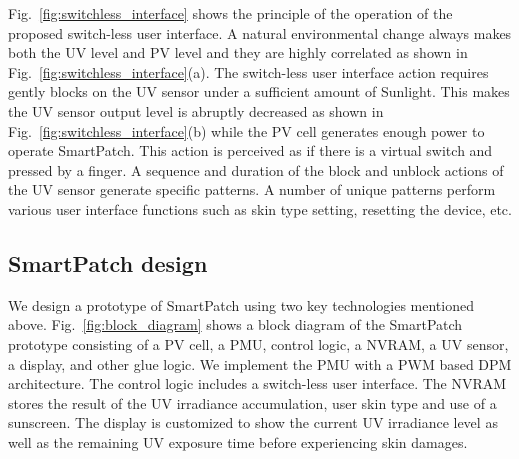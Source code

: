 \documentclass[journal]{IEEEtran}
\begin{document}
Fig.~\ref{fig:switchless_interface} shows the principle of the operation of the proposed switch-less user interface. A natural environmental change always makes both the UV level and PV level and they are highly correlated as shown in Fig.~\ref{fig:switchless_interface}(a). The switch-less user interface action requires gently blocks on the UV sensor under a sufficient amount of Sunlight. This makes the UV sensor output level is abruptly decreased as shown in Fig.~\ref{fig:switchless_interface}(b) while the PV cell generates enough power to operate SmartPatch. This action is perceived as if there is a virtual switch and pressed by a finger. A sequence and duration of the block and unblock actions of the UV sensor generate specific patterns. A number of unique patterns perform various user interface functions such as skin type setting, resetting the device, etc.

\subsection{SmartPatch design}

We design a prototype of SmartPatch using two key technologies mentioned above.
Fig.~\ref{fig:block_diagram} shows a block diagram of the SmartPatch prototype consisting of a PV cell, a PMU, control logic, a NVRAM, a UV sensor, a display, and other glue logic. We implement the PMU with a PWM based DPM architecture. The control logic includes a switch-less user interface. The NVRAM stores the result of the UV irradiance accumulation, user skin type and use of a sunscreen. The display is customized to show the current UV irradiance level as well as the remaining UV exposure time before experiencing skin damages.

%
\end{document}

